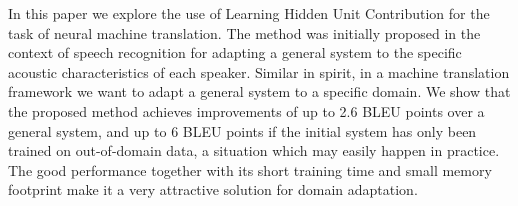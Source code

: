 In this paper we explore the use of Learning Hidden Unit Contribution for the task of neural machine translation. The method was initially proposed in the context of speech recognition for adapting a general system to the specific acoustic characteristics of each speaker. Similar in spirit, in a machine translation framework we want to adapt a general system to a specific domain. We show that the proposed method achieves improvements of up to 2.6 BLEU points over a general system, and up to 6 BLEU points if the initial system has only been trained on out-of-domain data, a situation which may easily happen in practice.  The good performance together with its short training time and small memory footprint make it a very attractive solution for domain adaptation.
